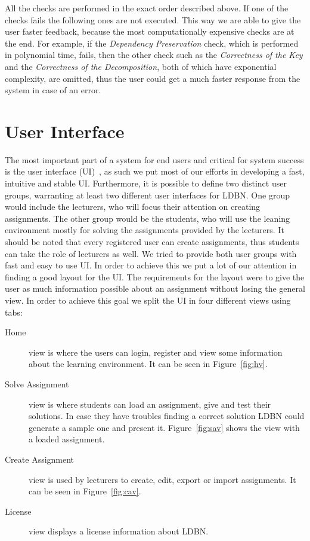 All the checks are performed in the exact order described above. If one of the checks fails the following ones
are not executed. This way we are able to give the user faster feedback, because 
the most computationally expensive checks are at the end. For example, if the \textit{Dependency Preservation}
check, which is performed in polynomial time, fails, then the other check such as the 
\textit{Correctness of the Key} and the \textit{Correctness of the Decomposition}, both of which 
have exponential complexity, are omitted, thus the user could get a much faster response from the system
in case of an error. 

\section{User Interface}
The most important part of a system for end users and critical for system 
success is the user interface (UI)~\cite{p9}, as such we put most of
our efforts in developing a fast, intuitive and stable UI. Furthermore,
it is possible to define two distinct user groups, warranting at least two different
user interfaces for LDBN.  One group would include the lecturers, who will
focus their attention on creating assignments. The other group would be the 
students, who will use the leaning environment mostly for solving 
the assignments provided by the lecturers. It should be noted that every registered
user can create assignments, thus students can take the role of lecturers as well.
We tried to provide both 
user groups with fast and easy to use UI. In order to achieve this we put a lot
of our attention in finding a good layout for the UI. The requirements for
the layout were to give the user as much information possible about an 
assignment without losing the general view. In order to achieve this goal  
we split the UI in four different views using tabs:

\begin{description}
	\item[Home] view is where the users can login, register and view some information 
	about the learning environment. It can be seen in Figure~\ref{fig:hv}.
	\item[Solve Assignment] view is where students can load an assignment, give and
	test their solutions. In case they have troubles finding a correct solution
	LDBN could generate a sample one and present it. Figure~\ref{fig:sav} shows
	 the view with a loaded assignment.
	\item[Create Assignment] view is used by lecturers to create, edit, export or import
	assignments. It can be seen in Figure~\ref{fig:cav}.
	\item[License] view displays a license information about LDBN.
\end{description} 

